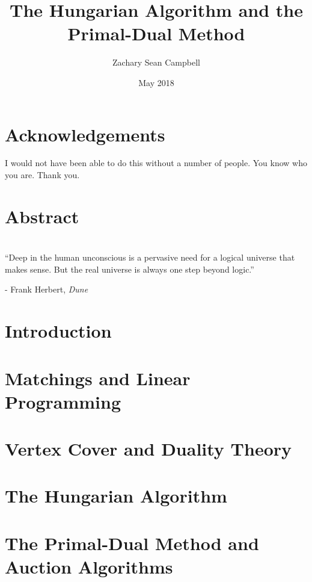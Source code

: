 \documentclass[12pt,twoside]{reedthesis}
\title{The Hungarian Algorithm and the Primal-Dual Method}
\author{Zachary Sean Campbell}
\date{May 2018}
\renewcommand{\'}{^{'}}
\theoremstyle{plain}
\theoremstyle{definition}
\begin{document}
    \maketitle
    \frontmatter %
    \pagestyle{empty} %

\chapter*{Acknowledgements}
I would not have been able to do this without a number of people. You know who you are. Thank you.

\tableofcontents
\chapter*{Abstract}
\chapter*{}
``Deep in the human unconscious is a pervasive need for a logical universe that makes sense. But the 
real universe is always one step beyond logic.''

- Frank Herbert, \emph{Dune}
\mainmatter %
\pagestyle{fancyplain} %

\chapter*{Introduction}

	
	
\chapter{Matchings and Linear Programming}



\chapter{Vertex Cover and Duality Theory}



\chapter{The Hungarian Algorithm}



\chapter{The Primal-Dual Method and Auction Algorithms}


	

\backmatter %

\nocite{*}


\end{document}
